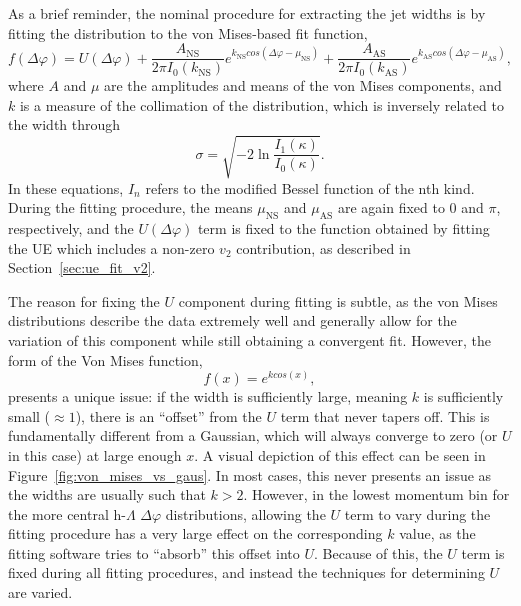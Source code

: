 As a brief reminder, the nominal procedure for extracting the jet widths is by fitting the \dphi distribution to the von Mises-based fit function,
%
\begin{equation}
    \label{eq:von_mises_ref}
    f(\Delta\varphi) = U(\Delta\varphi) + \frac{A_{\text{NS}}}{2\pi I_0(k_{\text{NS}})} e^{k_{\text{NS}}cos(\Delta\varphi - \mu_{\text{NS}})} + \frac{A_{\text{AS}}}{2\pi I_0(k_{\text{AS}})} e^{k_{\text{AS}}cos(\Delta\varphi - \mu_{\text{AS}})},
\end{equation}
%
where $A$ and $\mu$ are the amplitudes and means of the von Mises components, and $k$ is a measure of the collimation of the distribution, which is inversely related to the width through
%
\begin{equation}
    \label{eq:kappa_to_sigma_ref}
    \sigma = \sqrt{-2\ln\frac{I_{1}(\kappa)}{I_{0}(\kappa)}}.
\end{equation}
%
In these equations, $I_n$ refers to the modified Bessel function of the nth kind. During the fitting procedure, the means $\mu_{\text{NS}}$ and $\mu_{\text{AS}}$ are again fixed to 0 and $\pi$, respectively, and the $U(\Delta\varphi)$ term is fixed to the function obtained by fitting the UE which includes a non-zero $v_{2}$ contribution, as described in Section~\ref{sec:ue_fit_v2}.

The reason for fixing the $U$ component during fitting is subtle, as the von Mises distributions describe the data extremely well and generally allow for the variation of this component while still obtaining a convergent fit. However, the form of the Von Mises function,
%
\begin{equation}
    \label{eq:von_mises_form}
    f(x) = e^{k cos(x)},
\end{equation}
%
 presents a unique issue: if the width is sufficiently large, meaning $k$ is sufficiently small ($\approx 1$), there is an ``offset'' from the $U$ term that never tapers off. This is fundamentally different from a Gaussian, which will always converge to zero (or $U$ in this case) at large enough $x$. A visual depiction of this effect can be seen in Figure~\ref{fig:von_mises_vs_gaus}. In most cases, this never presents an issue as the widths are usually such that $k > 2$. However, in the lowest momentum bin for the more central h-$\Lambda$ $\Delta\varphi$ distributions, allowing the $U$ term to vary during the fitting procedure has a very large effect on the corresponding $k$ value, as the fitting software tries to ``absorb'' this offset into $U$. Because of this, the $U$ term is fixed during all fitting procedures, and instead the techniques for determining $U$ are varied. 

